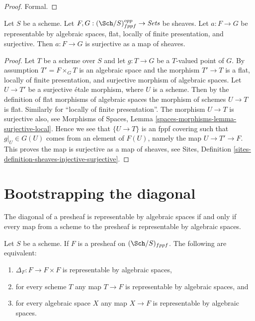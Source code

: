 \begin{proof}
Formal.
\end{proof}

\begin{lemma}
\label{lemma-surjective-flat-locally-finite-presentation}
Let $S$ be a scheme.
Let $F, G : (\Sch/S)_{fppf}^{opp} \to \textit{Sets}$ be sheaves.
Let $a : F \to G$ be representable by algebraic spaces, flat,
locally of finite presentation, and surjective.
Then $a : F \to G$ is surjective as a map of sheaves.
\end{lemma}

\begin{proof}
Let $T$ be a scheme over $S$ and let $g : T \to G$ be a $T$-valued point of
$G$. By assumption $T' = F \times_G T$ is an algebraic space and
the morphism $T' \to T$ is a flat, locally of finite presentation, and
surjective morphism of algebraic spaces.
Let $U \to T'$ be a surjective \'etale morphism, where $U$ is a scheme.
Then by the definition of flat morphisms of algebraic spaces
the morphism of schemes $U \to T$ is flat. Similarly for
``locally of finite presentation''. The morphism $U \to T$ is surjective
also, see
Morphisms of Spaces, Lemma \ref{spaces-morphisms-lemma-surjective-local}.
Hence we see that $\{U \to T\}$ is an fppf covering such
that $g|_U \in G(U)$ comes from an element of $F(U)$, namely
the map $U \to T' \to F$. This proves the map is surjective as
a map of sheaves, see
Sites, Definition \ref{sites-definition-sheaves-injective-surjective}.
\end{proof}




\section{Bootstrapping the diagonal}
\label{section-bootstrap-diagonal}

\begin{lemma}
\label{lemma-representable-diagonal}
\begin{slogan}
The diagonal of a presheaf is representable by algebraic spaces if and only if
every map from a scheme to the presheaf is representable by algebraic spaces.
\end{slogan}
Let $S$ be a scheme.
If $F$ is a presheaf on $(\Sch/S)_{fppf}$.
The following are equivalent:
\begin{enumerate}
\item $\Delta_F : F \to F \times F$ is representable by algebraic spaces,
\item for every scheme $T$ any map $T \to F$ is representable by algebraic
spaces, and
\item for every algebraic space $X$ any map $X \to F$ is representable
by algebraic spaces.
\end{enumerate}
\end{lemma}

